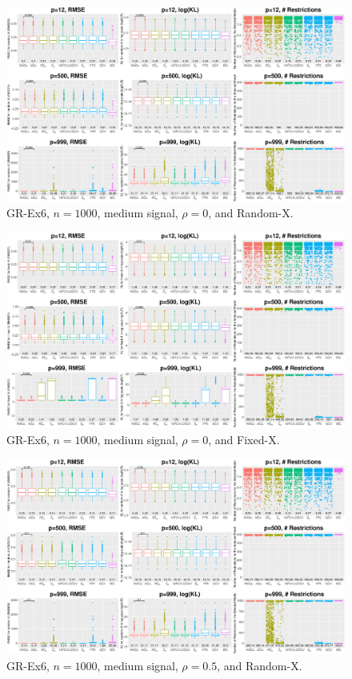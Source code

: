\clearpage
\begin{figure}[!ht]
\centering
\includegraphics[width=\textwidth]{figures/supplement/randomx_GR-Ex6_n1000_msnr_rho0.eps}
\caption{GR-Ex6, $n=1000$, medium signal, $\rho=0$, and Random-X.}
\end{figure}
\begin{figure}[!ht]
\centering
\includegraphics[width=\textwidth]{figures/supplement/fixedx_GR-Ex6_n1000_msnr_rho0.eps}
\caption{GR-Ex6, $n=1000$, medium signal, $\rho=0$, and Fixed-X.}
\end{figure}
\clearpage
\begin{figure}[!ht]
\centering
\includegraphics[width=\textwidth]{figures/supplement/randomx_GR-Ex6_n1000_msnr_rho05.eps}
\caption{GR-Ex6, $n=1000$, medium signal, $\rho=0.5$, and Random-X.}
\end{figure}
